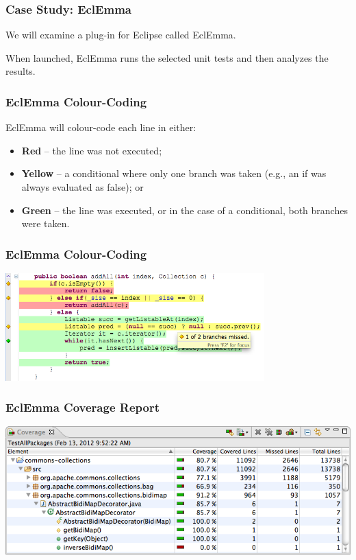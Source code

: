 \begin{frame}
\frametitle{Case Study: EclEmma}
\begin{changemargin}{1cm}
We will examine a plug-in for Eclipse called EclEmma.

When launched, EclEmma runs the selected unit tests and then analyzes the results.

\end{changemargin}
\end{frame}

\begin{frame}
\frametitle{EclEmma Colour-Coding}
\begin{changemargin}{1cm}


EclEmma will colour-code each line in either:
\begin{itemize}
	\item \textbf{Red} -- the line was not executed;
	\item \textbf{Yellow} -- a conditional where only one branch was taken (e.g., an if was always evaluated as false); or
	\item \textbf{Green} -- the line was executed, or in the case of a conditional, both branches were taken.
\end{itemize}

\end{changemargin}
\end{frame}

\begin{frame}
\frametitle{EclEmma Colour-Coding}
\begin{center}
	\includegraphics[width=0.75\textwidth]{images/annotations.png}
\end{center}
\end{frame}

\begin{frame}
\frametitle{EclEmma Coverage Report}
\begin{center}
	\includegraphics[width=\textwidth]{images/coverageview.png}
\end{center}
\end{frame}

